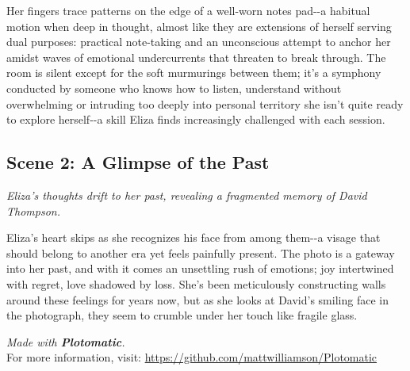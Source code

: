 \documentclass[12pt]{report}  %
\begin{document}
Her fingers trace patterns on the edge of a well-worn notes pad-\/-a
habitual motion when deep in thought, almost like they are extensions of
herself serving dual purposes: practical note-taking and an unconscious
attempt to anchor her amidst waves of emotional undercurrents that
threaten to break through. The room is silent except for the soft
murmurings between them; it's a symphony conducted by someone who knows
how to listen, understand without overwhelming or intruding too deeply
into personal territory she isn't quite ready to explore herself-\/-a
skill Eliza finds increasingly challenged with each session.


\subsection*{Scene 2: A Glimpse of the Past}
\textit{Eliza's thoughts drift to her past, revealing a fragmented memory of David Thompson.}

Eliza's heart skips as she recognizes his face from among them-\/-a
visage that should belong to another era yet feels painfully present.
The photo is a gateway into her past, and with it comes an unsettling
rush of emotions; joy intertwined with regret, love shadowed by loss.
She's been meticulously constructing walls around these feelings for
years now, but as she looks at David's smiling face in the photograph,
they seem to crumble under her touch like fragile glass.



    \newpage
    \vfill
    \begin{center}
    \textit{Made with \textbf{Plotomatic}.} \\
    For more information, visit: \url{https://github.com/mattwilliamson/Plotomatic}
    \end{center}
    
\end{document}
